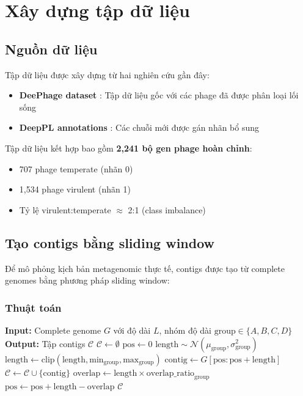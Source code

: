 \section{Xây dựng tập dữ liệu}
\label{sec:dataset}

\subsection{Nguồn dữ liệu}

Tập dữ liệu được xây dựng từ hai nghiên cứu gần đây:

\begin{itemize}
    \item \textbf{DeePhage dataset} \cite{wu2021deephage}: Tập dữ liệu gốc với các phage đã được phân loại lối sống
    \item \textbf{DeepPL annotations} \cite{zhang2024deeppl}: Các chuỗi mới được gán nhãn bổ sung
\end{itemize}

Tập dữ liệu kết hợp bao gồm \textbf{2,241 bộ gen phage hoàn chỉnh}:
\begin{itemize}
    \item 707 phage temperate (nhãn 0)
    \item 1,534 phage virulent (nhãn 1)
    \item Tỷ lệ virulent:temperate $\approx$ 2:1 (class imbalance)
\end{itemize}

\subsection{Tạo contigs bằng sliding window}

Để mô phỏng kịch bản metagenomic thực tế, contigs được tạo từ complete genomes bằng phương pháp sliding window:

\subsubsection{Thuật toán}

\begin{algorithm}[h]
\caption{Contig Generation với Sliding Window}
\label{alg:contig_generation}
\begin{algorithmic}[1]
\State \textbf{Input:} Complete genome $G$ với độ dài $L$, nhóm độ dài $\text{group} \in \{A, B, C, D\}$
\State \textbf{Output:} Tập contigs $\mathcal{C}$
\State $\mathcal{C} \leftarrow \emptyset$
\State $\text{pos} \leftarrow 0$
    \State $\text{length} \sim \mathcal{N}(\mu_{\text{group}}, \sigma_{\text{group}}^2)$ 
    \State $\text{length} \leftarrow \text{clip}(\text{length}, \text{min}_{\text{group}}, \text{max}_{\text{group}})$
    \State $\text{contig} \leftarrow G[\text{pos}:\text{pos}+\text{length}]$
    \State $\mathcal{C} \leftarrow \mathcal{C} \cup \{\text{contig}\}$
    \State $\text{overlap} \leftarrow \text{length} \times \text{overlap\_ratio}_{\text{group}}$
    \State $\text{pos} \leftarrow \text{pos} + \text{length} - \text{overlap}$
\EndWhile
\State \Return $\mathcal{C}$
\end{algorithmic}
\end{algorithm}

